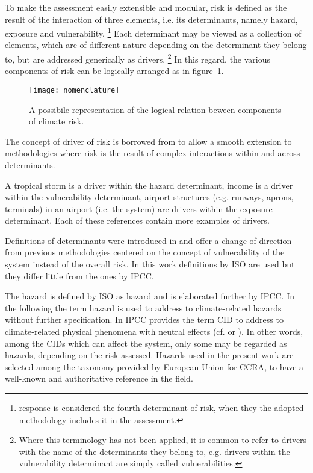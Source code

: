 To make the assessment easily extensible and modular, \gls{risk} is defined as the result of the interaction of three elements, i.e. its \glspl{determinant}, namely \gls{hazard}, \gls{exposure} and \gls{vulnerability}.%
\footnote{\Gls{response} is considered the fourth \gls{determinant} of \gls{risk}, when they the adopted methodology includes it in the assessment.}
Each \gls{determinant} may be viewed as a collection of elements, which are of different nature depending on the \gls{determinant} they belong to, but are addressed generically as \glspl{driver}.%
\footnote{Where this terminology has not been applied, it is common to refer to \glspl{driver} with the name of the \glspl{determinant} they belong to, e.g. drivers within the \gls{vulnerability} determinant are simply called vulnerabilities.}
In this regard, the various components of \gls{risk} can be logically arranged as in figure~\ref{fig:nomenclature}.
\begin{figure}[h]
  \centering
  \texttt{[image: nomenclature]}
  \caption{A possibile representation of the logical relation beween components of climate \gls{risk}.}
  \label{fig:nomenclature}
\end{figure}
The concept of \gls{driver} of \gls{risk} is borrowed from \cite{2021SimpsonAFramework} to allow a smooth extension to methodologies where \gls{risk} is the result of complex interactions within and across \glspl{determinant}.
\begin{example}
  A tropical storm is a \gls{driver} within the \gls{hazard} \gls{determinant},\cite[15]{2017GIZRiskSupplement} income is a \gls{driver} within the \gls{vulnerability} \gls{determinant},\cite[493]{2021SimpsonAFramework} airport structures (e.g. runways, aprons, terminals) in an airport (i.e. the system) are \glspl{driver} within the \gls{exposure} \gls{determinant}.\cite[551]{2022DeVivoRiskAssessment} Each of these references contain more examples of \glspl{driver}.
\end{example}

Definitions of \glspl{determinant} were introduced in \cite[69-70]{2012FieldManagingThe} and offer a change of direction from previous methodologies centered on the concept of \gls{vulnerability} of the system instead of the overall \gls{risk}.\cite{2017GIZTheVulnerability,2017GIZRiskSupplement}
In this work definitions by \gls{ISO} are used but they differ little from the ones by \gls{IPCC}.

The \gls{hazard} is defined by \gls{ISO} as \glsdesc{hazard} and is elaborated further by \gls{IPCC}. In the following the term \gls{hazard} is used to address to climate-related \glspl{hazard} without further specification.
In \cite[2224]{2021MatthewsAnnexVII} \gls{IPCC} provides the term \gls{CID} to address to climate-related physical phenomena with neutral effects (cf. \cite[10]{2020ReisingerTheConcept} or \cite[1871]{2021RanasingheClimateChange}). In other words, among the \glspl{CID} which can affect the system, only some may be regarded as \glspl{hazard}, depending on the \gls{risk} assessed.
Hazards used in the present work are selected among the taxonomy provided by European Union for \gls{CCRA}, to have a well-known and authoritative reference in the field.\cite[177]{2024EU20212139}

